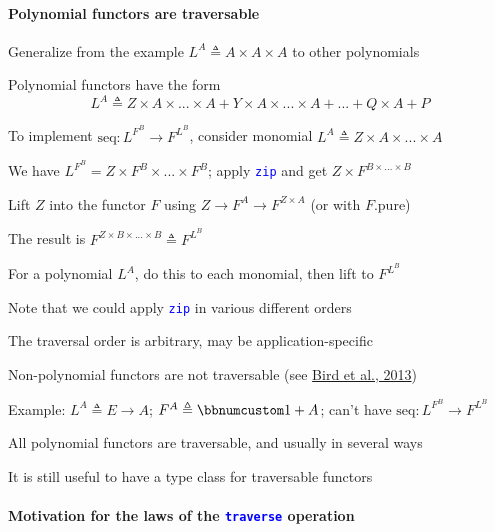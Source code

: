 \paragraph{Polynomial functors are traversable}

\vspace{-0.1cm}Generalize from the example $L^{A}\triangleq A\times A\times A$
to other polynomials

Polynomial functors have the form {\small{}
\[
L^{A}\triangleq Z\times A\times...\times A+Y\times A\times...\times A+...+Q\times A+P
\]
}{\small\par}

To implement {\small{}$\text{seq}:L^{F^{B}}\rightarrow F^{L^{B}}$},
consider monomial {\small{}$L^{A}\triangleq Z\times A\times...\times A$}{\small\par}

We have $L^{F^{B}}=Z\times F^{B}\times...\times F^{B}$; apply \texttt{\textcolor{blue}{\footnotesize{}zip}}
and get $Z\times F^{B\times...\times B}$ 

Lift $Z$ into the functor $F$ using $Z\rightarrow F^{A}\rightarrow F^{Z\times A}$
(or with $F.\text{pure}$)

The result is $F^{Z\times B\times...\times B}\triangleq F^{L^{B}}$

For a polynomial $L^{A}$, do this to each monomial, then lift to
$F^{L^{B}}$

Note that we could apply \texttt{\textcolor{blue}{\footnotesize{}zip}}
in various different orders

The traversal order is arbitrary, may be application-specific

Non-polynomial functors are not traversable (see \href{http://www.cs.ox.ac.uk/jeremy.gibbons/publications/uitbaf.pdf}{Bird et al., 2013})

Example: $L^{A}\triangleq E\rightarrow A$; $F^{A}\triangleq\bbnum 1+A$;
can't have {\small{}$\text{seq}:L^{F^{B}}\rightarrow F^{L^{B}}$}{\small\par}

All polynomial functors are traversable, and usually in several ways

It is still useful to have a type class for traversable functors


\paragraph{Motivation for the laws of the \texttt{\textcolor{blue}{\footnotesize{}traverse}}
operation}

